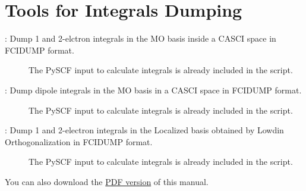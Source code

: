 \documentclass[letterpaper,10pt,english]{sphinxmanual}
\begin{document}
\section{Tools for Integrals Dumping}
\label{integralsdump:tools-for-integrals-dumping}\label{integralsdump::doc}\begin{description}
\item[{: Dump 1 and 2-elctron integrals in the MO basis inside a CASCI space in FCIDUMP format.}] \leavevmode
The PySCF input to calculate integrals is already included in the script.

\item[{: Dump dipole integrals in the MO basis in a CASCI space in FCIDUMP format.}] \leavevmode
The PySCF input to calculate integrals is already included in the script.

\item[{: Dump 1 and 2-electron integrals in the Localized basis obtained by Lowdin Orthogonalization in FCIDUMP format.}] \leavevmode
The PySCF input to calculate integrals is already included in the script.

\end{description}

You can also download the \href{https://raw.github.com/eronca/PYQCTools/gh-pages/latex/PYQCTools.pdf}{PDF version} of this manual.



\renewcommand{\indexname}{Index}
\printindex
\end{document}
